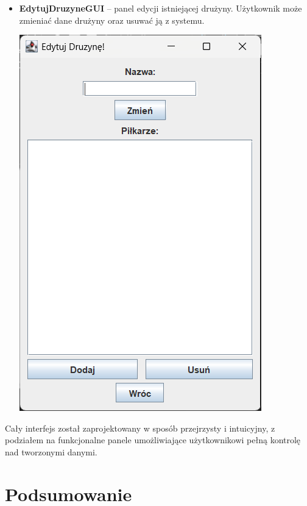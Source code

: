 \documentclass{urdpl}     %
\begin{document}
\begin{itemize}
  \item
  \begin{minipage}[t]{\linewidth}
    \textbf{EdytujDruzyneGUI} -- panel edycji istniejącej drużyny. Użytkownik może zmieniać dane drużyny oraz usuwać ją z systemu.

    \vspace{0.3em}
    \begin{center}
      \includegraphics[width=0.75\linewidth]{edytujdruzyne.png}
      \label{fig:edytujdruzyne}
    \end{center}
  \end{minipage}
\end{itemize}

\vspace{1em}
\noindent
Cały interfejs został zaprojektowany w sposób przejrzysty i intuicyjny, z podziałem na funkcjonalne panele umożliwiające użytkownikowi pełną kontrolę nad tworzonymi danymi.

\chapter{Podsumowanie}\label{5}
\end{document}
